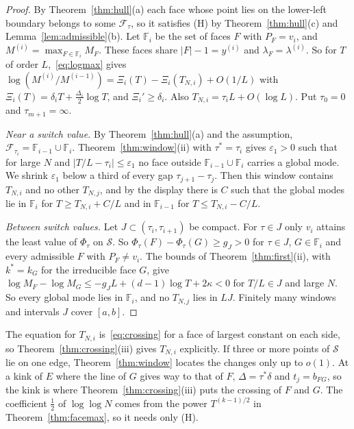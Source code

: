 \begin{proof}
By Theorem~\ref{thm:hull}(a) each face whose point lies on the lower-left boundary belongs to
some $\mathcal F_\tau$, so it satisfies (H) by Theorem~\ref{thm:hull}(c) and
Lemma~\ref{lem:admissible}(b). Let $\mathbb F_i$ be the set of faces $F$ with $P_F=v_i$, and
$M^{(i)}=\max_{F\in\mathbb F_i}M_F$. These faces share $|F|-1=y^{(i)}$ and
$\lambda_F=\lambda^{(i)}$. So for $T$ of order $L$,~\eqref{eq:logmax} gives
$\log(M^{(i)}/M^{(i-1)})=\Xi_i(T)-\Xi_i(T_{N,i})+O(1/L)$ with
$\Xi_i(T)=\delta_iT+\frac{\Delta_i}2\log T$, and $\Xi_i'\ge\delta_i$. Also
$T_{N,i}=\tau_iL+O(\log L)$. Put $\tau_0=0$ and $\tau_{m+1}=\infty$.

\emph{Near a switch value.} By Theorem~\ref{thm:hull}(a) and the assumption,
$\mathcal F_{\tau_i}=\mathbb F_{i-1}\cup\mathbb F_i$. Theorem~\ref{thm:window}(ii) with
$\tau^*=\tau_i$ gives $\varepsilon_1>0$ such that for large $N$ and $|T/L-\tau_i|\le\varepsilon_1$
no face outside $\mathbb F_{i-1}\cup\mathbb F_i$ carries a global mode. We shrink
$\varepsilon_1$ below a third of every gap $\tau_{j+1}-\tau_j$. Then this window contains
$T_{N,i}$ and no other $T_{N,j}$, and by the display there is $C$ such that the global modes lie
in $\mathbb F_i$ for $T\ge T_{N,i}+C/L$ and in $\mathbb F_{i-1}$ for $T\le T_{N,i}-C/L$.

\emph{Between switch values.} Let $J\subset(\tau_i,\tau_{i+1})$ be compact. For $\tau\in J$ only
$v_i$ attains the least value of $\Phi_\tau$ on $\mathcal S$. So $\Phi_\tau(F)-\Phi_\tau(G)\ge g_J>0$
for $\tau\in J$, $G\in\mathbb F_i$ and every admissible $F$ with $P_F\ne v_i$. The bounds of
Theorem~\ref{thm:first}(ii), with $k^*=k_G$ for the irreducible face $G$, give
$\log M_F-\log M_G\le-g_JL+(d-1)\log T+2\kappa<0$ for $T/L\in J$ and large $N$. So every
global mode lies in $\mathbb F_i$, and no $T_{N,j}$ lies in $LJ$. Finitely many windows and
intervals $J$ cover $[a,b]$.
\end{proof}

The equation for $T_{N,i}$ is~\eqref{eq:crossing} for a face of largest constant on each side,
so Theorem~\ref{thm:crossing}(iii) gives $T_{N,i}$ explicitly. If three or more points of
$\mathcal S$ lie on one edge, Theorem~\ref{thm:window} locates the changes only up to $o(1)$. At a
kink of $E$ where the line of $G$ gives way to that of $F$, $\Delta=\tau^*\delta$ and
$t_j=b_{FG}$, so the kink is where Theorem~\ref{thm:crossing}(iii) puts the crossing of $F$ and
$G$. The coefficient $\frac12$ of $\log\log N$ comes from the power $T^{(k-1)/2}$ in
Theorem~\ref{thm:facemax}, so it needs only (H).

